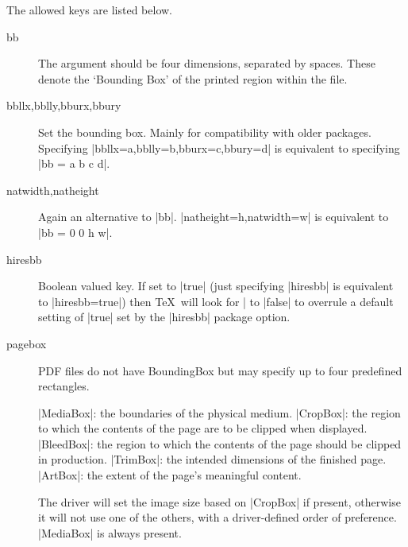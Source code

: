The allowed keys are listed below.
\begin{description}
\item[bb] The argument should be four dimensions, separated by spaces.
  These denote the `Bounding Box' of the printed region within
  the file.
\item[bbllx,bblly,bburx,bbury] Set the bounding box. Mainly for
 compatibility with older packages.
 Specifying |bbllx=a,bblly=b,bburx=c,bbury=d|
 is equivalent to specifying |bb = a b c d|.
\item[natwidth,natheight] Again an alternative to |bb|.
 |natheight=h,natwidth=w| is equivalent to |bb = 0 0 h w|.
\item[hiresbb]
 Boolean valued key. If set to |true| (just specifying |hiresbb|
 is equivalent to |hiresbb=true|) then \TeX\ will look for
 |%
 to |false| to overrule a default setting of |true| set by the
 |hiresbb| package option.
\item[pagebox]
PDF files do not have BoundingBox but may specify up to four predefined
rectangles.

|MediaBox|: the boundaries of the physical medium.
|CropBox|: the region to which the contents of the page are to be
  clipped when displayed.
|BleedBox|: the region to which the contents of the
 page should be clipped in production.
|TrimBox|: the intended dimensions of the finished page.
|ArtBox|: the extent of the page's meaningful content.

The driver will set the image size based on |CropBox| if present,
otherwise it will not use one of the others,
with a driver-defined order of preference.
|MediaBox| is always present.


\end{description}
